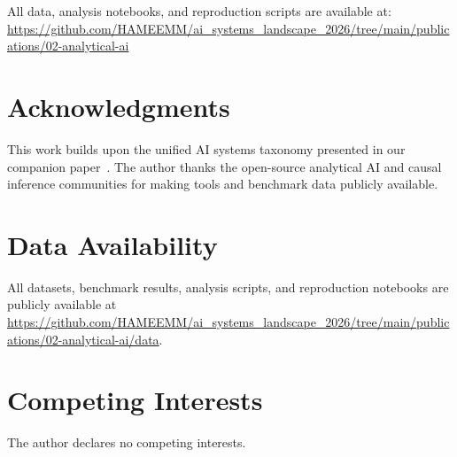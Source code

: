 \documentclass[12pt, a4paper]{article}
\begin{document}
All data, analysis notebooks, and reproduction scripts are available at: \\
{\small\url{https://github.com/HAMEEMM/ai_systems_landscape_2026/tree/main/publications/02-analytical-ai}}

\section*{Acknowledgments}
This work builds upon the unified AI systems taxonomy presented in our companion paper~\citep{mahdi2026taxonomy}. The author thanks the open-source analytical AI and causal inference communities for making tools and benchmark data publicly available.

\section*{Data Availability}
All datasets, benchmark results, analysis scripts, and reproduction notebooks are publicly available at \url{https://github.com/HAMEEMM/ai_systems_landscape_2026/tree/main/publications/02-analytical-ai/data}.

\section*{Competing Interests}
The author declares no competing interests.


\end{document}
